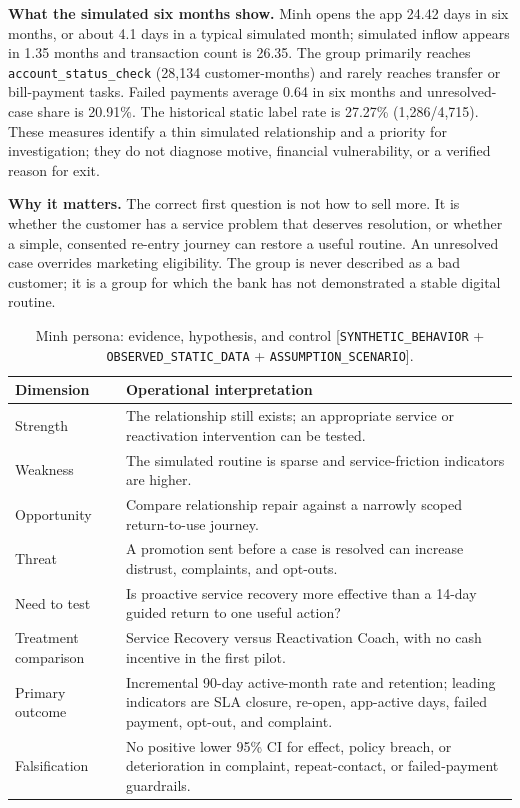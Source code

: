 \documentclass[a4paper,12pt]{article}
\newcommand{\observed}{\texttt{OBSERVED\_STATIC\_DATA}}
\newcommand{\synthetic}{\texttt{SYNTHETIC\_BEHAVIOR}}
\newcommand{\scenario}{\texttt{ASSUMPTION\_SCENARIO}}
\begin{document}
\textbf{What the simulated six months show.} Minh opens the app 24.42 days in six months, or about 4.1 days in a typical simulated month; simulated inflow appears in 1.35 months and transaction count is 26.35. The group primarily reaches \texttt{account\_status\_check} (28,134 customer-months) and rarely reaches transfer or bill-payment tasks. Failed payments average 0.64 in six months and unresolved-case share is 20.91\%. The historical static label rate is 27.27\% (1,286/4,715). These measures identify a thin simulated relationship and a priority for investigation; they do not diagnose motive, financial vulnerability, or a verified reason for exit.

\textbf{Why it matters.} The correct first question is not how to sell more. It is whether the customer has a service problem that deserves resolution, or whether a simple, consented re-entry journey can restore a useful routine. An unresolved case overrides marketing eligibility. The group is never described as a bad customer; it is a group for which the bank has not demonstrated a stable digital routine.

\begin{table}[H]
\centering
\caption{Minh persona: evidence, hypothesis, and control [\synthetic{} + \observed{} + \scenario].}
\label{tab:minh-persona}
\small
\begin{tabularx}{\textwidth}{P{0.20\textwidth}Y}
\toprule
\textbf{Dimension} & \textbf{Operational interpretation}\\
\midrule
Strength & The relationship still exists; an appropriate service or reactivation intervention can be tested.\\
Weakness & The simulated routine is sparse and service-friction indicators are higher.\\
Opportunity & Compare relationship repair against a narrowly scoped return-to-use journey.\\
Threat & A promotion sent before a case is resolved can increase distrust, complaints, and opt-outs.\\
Need to test & Is proactive service recovery more effective than a 14-day guided return to one useful action?\\
Treatment comparison & Service Recovery versus Reactivation Coach, with no cash incentive in the first pilot.\\
Primary outcome & Incremental 90-day active-month rate and retention; leading indicators are SLA closure, re-open, app-active days, failed payment, opt-out, and complaint.\\
Falsification & No positive lower 95\% CI for effect, policy breach, or deterioration in complaint, repeat-contact, or failed-payment guardrails.\\
\bottomrule
\end{tabularx}
\end{table}
\end{document}
